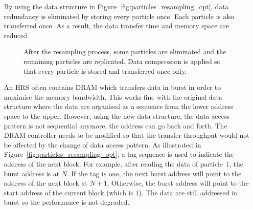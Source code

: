 By using the data structure in Figure~\ref{fig:particles_resampling_opt}, data redundancy is eliminated by storing every particle once.
Each particle is also transferred once.
As a result, the data transfer time and memory space are reduced.

\setcounter{subfigure}{0}
\begin{figure}[t!]
\centering
{}
\caption{After the resampling process, some particles are eliminated and the remaining particles are replicated. Data compression is applied so that every particle is stored and transferred once only.}
\label{fig:particles_resampling}
\end{figure}

An HRS often contains DRAM which transfers data in burst in order to maximise the memory bandwidth.
This works fine with the original data structure where the data are organised as a sequence from the lower address space to the upper.
However, using the new data structure, the data access pattern is not sequential anymore, the address can go back and forth.
The DRAM controller needs to be modified so that the transfer throughput would not be affected by the change of data access pattern.
As illustrated in Figure~\ref{fig:particles_resampling_opt}, a tag sequence is used to indicate the address of the next block.
For example, after reading the data of particle~1, the burst address is at $N$.
If the tag is one, the next burst address will point to the address of the next block at $N+1$.
Otherwise, the burst address will point to the start address of the current block (which is $1$).
The data are still addressed in burst so the performance is not degraded.


